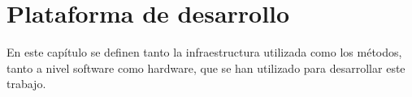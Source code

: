 \chapter{Plataforma de desarrollo}
\label{cap:capitulo3}



\vspace{1cm}

En este capítulo se definen tanto la infraestructura utilizada como los métodos, tanto a nivel software como hardware, que se han utilizado para desarrollar este trabajo.\\

